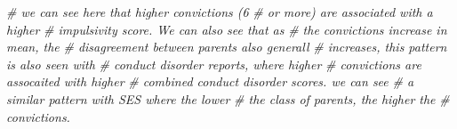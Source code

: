 \documentclass[]{tufte-handout}
\newenvironment{Shaded}{}{}
\newcommand{\KeywordTok}[1]{\textcolor[rgb]{0.00,0.44,0.13}{\textbf{#1}}}
\newcommand{\DataTypeTok}[1]{\textcolor[rgb]{0.56,0.13,0.00}{#1}}
\newcommand{\DecValTok}[1]{\textcolor[rgb]{0.25,0.63,0.44}{#1}}
\newcommand{\StringTok}[1]{\textcolor[rgb]{0.25,0.44,0.63}{#1}}
\newcommand{\CommentTok}[1]{\textcolor[rgb]{0.38,0.63,0.69}{\textit{#1}}}
\newcommand{\OperatorTok}[1]{\textcolor[rgb]{0.40,0.40,0.40}{#1}}
\newcommand{\NormalTok}[1]{#1}
\begin{document}
\begin{Shaded}
\begin{Highlighting}[]
\CommentTok{# we can see here that higher convictions (6}
\CommentTok{# or more) are associated with a higher}
\CommentTok{# impulsivity score. We can also see that as}
\CommentTok{# the convictions increase in mean, the}
\CommentTok{# disagreement between parents also generall}
\CommentTok{# increases, this pattern is also seen with}
\CommentTok{# conduct disorder reports, where higher}
\CommentTok{# convictions are assocaited with higher}
\CommentTok{# combined conduct disorder scores. we can see}
\CommentTok{# a similar pattern with SES where the lower}
\CommentTok{# the class of parents, the higher the}
\CommentTok{# convictions.}
\end{Highlighting}
\end{Shaded}

\begin{Shaded}
\end{Shaded}
\end{document}
